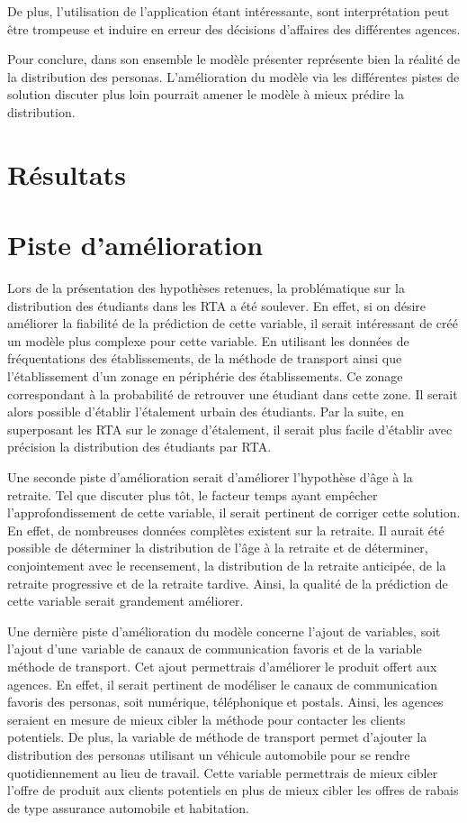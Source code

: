 \documentclass[11pt,french]{report}\usepackage[]{graphicx}\usepackage[]{color}
\begin{document}
De plus, l'utilisation de l'application étant intéressante, sont interprétation peut être trompeuse et induire en erreur des décisions d'affaires des différentes agences.

Pour conclure, dans son ensemble le modèle présenter représente bien la réalité de la distribution des personas. L'amélioration du modèle via les différentes pistes de solution discuter plus loin pourrait amener le modèle à mieux prédire la distribution.
 
\section*{Résultats}

\section*{Piste d'amélioration}
Lors de la présentation des hypothèses retenues, la problématique sur la distribution des étudiants dans les RTA a été soulever. En effet, si on désire améliorer la fiabilité de la prédiction de cette variable, il serait intéressant de créé un modèle plus complexe pour cette variable. En utilisant les données de fréquentations des établissements, de la méthode de transport ainsi que l'établissement d'un zonage en périphérie des établissements. Ce zonage correspondant à la probabilité de retrouver une étudiant dans cette zone. Il serait alors possible d'établir l'étalement urbain des étudiants. Par la suite, en superposant les RTA sur le zonage d'étalement, il serait plus facile d'établir avec précision la distribution des étudiants par RTA. 
\newline

Une seconde piste d'amélioration serait d'améliorer l'hypothèse d'âge à la retraite. Tel que discuter plus tôt, le facteur temps ayant empêcher l'approfondissement de cette variable, il serait pertinent de corriger cette solution. En effet, de nombreuses données complètes existent sur la retraite. Il aurait été possible de déterminer la distribution de l'âge à la retraite et de déterminer, conjointement avec le recensement, la distribution de la retraite anticipée, de la retraite progressive et de la retraite tardive. Ainsi, la qualité de la prédiction de cette variable serait grandement améliorer.

Une dernière piste d'amélioration du modèle concerne l'ajout de variables, soit l'ajout d'une variable de canaux de communication favoris et de la variable méthode de transport. Cet ajout permettrais d'améliorer le produit offert aux agences. En effet, il serait pertinent de modéliser le canaux de communication favoris des personas, soit numérique, téléphonique et postals. Ainsi, les agences seraient en mesure de mieux cibler la méthode pour contacter les clients potentiels. De plus, la variable de méthode de transport permet d'ajouter la distribution des personas utilisant un véhicule automobile pour se rendre quotidiennement au lieu de travail. Cette variable permettrais de mieux cibler l'offre de produit aux clients potentiels en plus de mieux cibler les offres de rabais de type assurance automobile et habitation.
\end{document}
